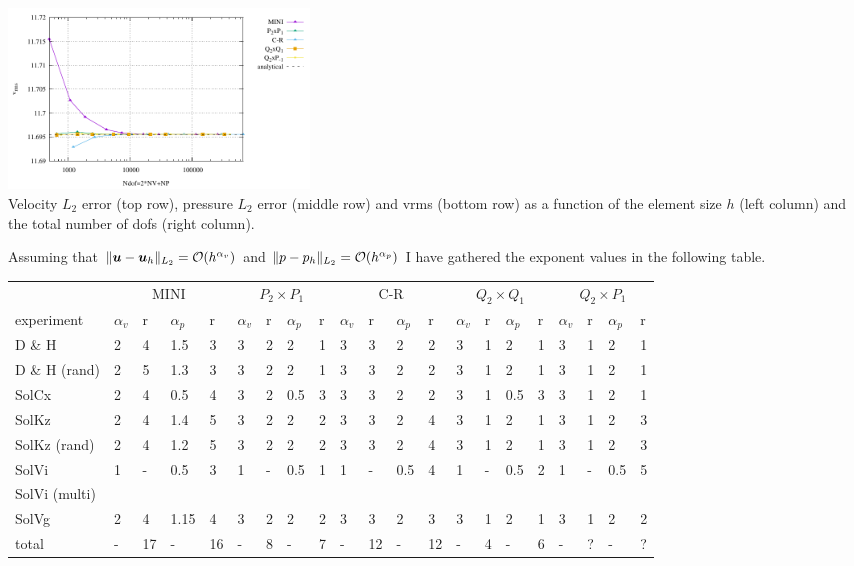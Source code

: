 \begin{center}
\includegraphics[width=8cm]{python_codes/fieldstone_112/results/exp6/vrms_ndof.pdf}\\
{\captionfont Velocity $L_2$ error (top row), pressure $L_2$ error (middle row) and vrms (bottom row) 
as a function of the element size $h$ (left column) and the total number of dofs (right column).}
\end{center}






\newpage




Assuming that $
\| {\bm u} - {\bm u}_h \|_{L_2} = {\cal O}(h^{\alpha_v})
$ and $
\| p - p_h \|_{L_2} = {\cal O}(h^{\alpha_p})
$
I have gathered the exponent values in the following 
table. 


\begin{tabular}{|l|llll|llll|llll|llll|llll|}
\hline
& 
\multicolumn{4}{c|}{MINI}&  
\multicolumn{4}{c|}{$P_2\times P_1$}  & 
\multicolumn{4}{c|}{C-R}  & 
\multicolumn{4}{c|}{$Q_2\times Q_1$} &  
\multicolumn{4}{c|}{$Q_2\times P_1$}  \\
experiment      & 
$\alpha_v$ & r  &  $\alpha_p$ & r &  
$\alpha_v$ & r  &  $\alpha_p$ & r &  
$\alpha_v$ & r  &  $\alpha_p$ & r &  
$\alpha_v$ & r  & $\alpha_p$ & r &   
$\alpha_v$ & r  & $\alpha_p$ & r \\
\hline
\hline
D \& H 
&{2}&4&1.5&3
&{3}&2&2&1
&{3}&3&2&2
&{3}&1&2&1
&{3}&1&2&1\\
D \& H (rand)
&2&5&1.3&3
&3&2&2&1
&3&3&2&2
&3&1&2&1
&3&1&2&1 \\
SolCx 
&2&4&0.5&4
&3&2&0.5&3
&3&3&2&2
&3&1&0.5&3
&3&1&2&1\\
SolKz 
&2&4&1.4&5
&3&2&2&2
&3&3&2&4
&3&1&2&1
&3&1&2&3\\
SolKz (rand)
&2&4&1.2&5
&3&2&2&2
&3&3&2&4
&3&1&2&1
&3&1&2&3\\
SolVi 
&1&-&0.5&3
&1&-&0.5&1
&1&-&0.5&4
&1&-&0.5&2
&1&-&0.5&5\\
SolVi (multi) \\ 
SolVg &
2&4&1.15&4&
3&2&2&2&
3&3&2&3&
3&1&2&1&
3&1&2&2\\
\hline
total  
&-&17&-&16
&-&8&-&7
&-&12&-&12
&-&4&-&6
&-&?&-&?\\
\hline
\end{tabular}

